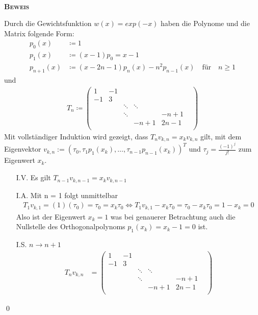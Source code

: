 \documentclass[12pt,a4paper]{scrartcl}
\numberwithin{equation}{section}
\numberwithin{myalgctr}{section}
\numberwithin{mytheoremctr}{subsection}
\numberwithin{mykorollarctr}{subsection}
\numberwithin{mylemmactr}{subsection}
\numberwithin{mybeispielctr}{subsection}
\newenvironment{myproof}{%
	\bigskip\noindent%
	\textsc{\textbf{\\Beweis\\}}%
	\indent
}{\qed\par\bigskip}  %
\begin{document}
	\begin{myproof}
				Durch die Gewichtsfunktion $w(x) = exp(-x)$ haben die Polynome und die Matrix folgende Form:	
		\begin{align*}	
		p_0(x) &\coloneqq 1\\	
		p_1(x) &\coloneqq (x-1) p_0 = x-1 \\	
		p_{n+1}(x) &\coloneqq (x-2n-1)p_n(x)-n^2 p_{n-1}(x) \quad \text{f\"ur}  \quad n\geq 1	
		\end{align*} 	
		und 	
		\begin{align*}	
		T_n\coloneqq 	
		\begin{pmatrix}	
		1 		     & 	-1			 	&  				  & &\\	
		-1		 	 & 3				& 			   	  & & \\	
		&   		 & \ddots 		    & \ddots 			&\\	
		&					& \ddots 	&					& -n+1\\	
		&		&			&-n+1 		&2n-1				&\\	
		\end{pmatrix}	
		\end{align*}	
		Mit vollständiger Induktion wird gezeigt, dass $T_nv_{k,n} = x_kv_{k,n}$ gilt, mit dem Eigenvektor 	
		$v_{k,n} := (\tau_0,\tau_1p_1(x_k),\ldots,\tau_{n-1}p_{n-1}(x_k))^{T}$ und $\tau_j = \frac{(-1)^{j}}{j!}$ zum Eigenwert $x_k$.	
		\begin{itemize}	
			\item[I.V.] 	
			Es gilt $T_{n-1}v_{k,n-1} = x_kv_{k,n-1}$	
			\item[I.A.] 	
			Mit n = 1 folgt unmittelbar	
			\begin{align*}	
			T_1v_{k,1} = (1)(\tau_0) = \tau_0 = x_k\tau_0 \Leftrightarrow T_1v_{k,1} - x_k\tau_0 = \tau_0 - x_k\tau_0 = 1 - x_k = 0	
			\end{align*}	
			Also ist der Eigenwert $x_k = 1$ was bei genauerer Betrachtung auch die Nullstelle des Orthogonalpolynoms $p_1(x_k) = x_k - 1 = 0$ ist. 	
			\item[I.S.] $n \rightarrow n + 1$	
			\begin{align*}	 	
				T_nv_{k,n}
				& =
				\begin{pmatrix}	
					1 		     & 	-1			 	&  				  & &\\	
					-1		 	 & 3				& 			   	  & & \\	
					&   		 & \ddots 		    & \ddots 			&\\	
					&					& \ddots 	&					& -n+1\\	
					&		&			&-n+1 		&2n-1				&\\	

\end{pmatrix}
\end{align*}
\end{itemize}
\end{myproof}
\end{document}

